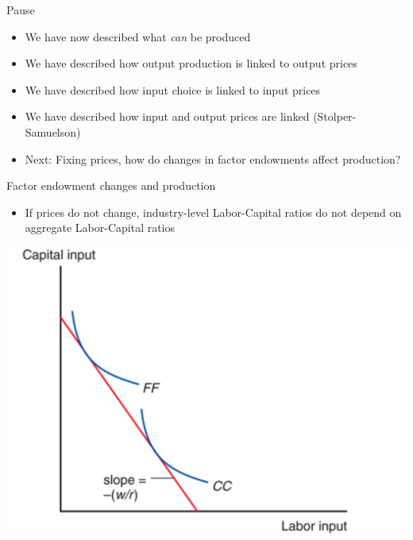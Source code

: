 \documentclass[ignorenonframetext,]{beamer}
\begin{document}
\begin{frame}{Pause} 
    \begin{itemize}
        \item We have now described what \emph{can} be produced
        \item We have described how output production is linked to output prices
        \item We have described how input choice is linked to input prices
        \item We have described how input and output prices are linked (Stolper-Samuelson)
        \item Next: Fixing prices, how do changes in factor endowments affect production?
    \end{itemize}

\end{frame}

\begin{frame}{Factor endowment changes and production}

    \begin{itemize}
        \item If prices do not change, industry-level Labor-Capital ratios do not depend on aggregate Labor-Capital ratios 
    \end{itemize}
    \includegraphics[scale=0.2]{two_factor_choice.png}

\end{frame}
\end{document}
